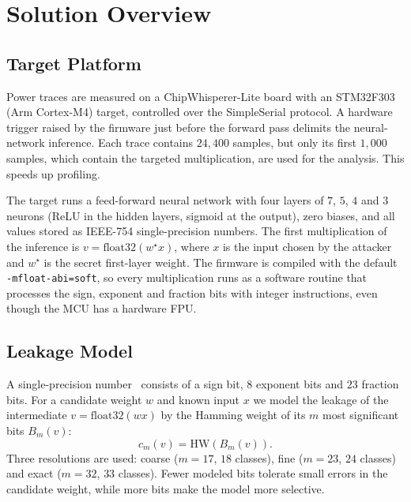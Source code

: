 \chapter{Solution Overview}
\label{chap:solution}

\section{Target Platform}
\label{sec:target-platform}

Power traces are measured on a ChipWhisperer-Lite board with an
STM32F303 (Arm Cortex-M4) target, controlled over the SimpleSerial
protocol. A hardware trigger raised by the firmware just before the
forward pass delimits the neural-network inference. Each trace contains
$24{,}400$ samples, but only its first $1{,}000$ samples, which contain
the targeted multiplication, are used for the analysis. This speeds up
profiling.

The target runs a feed-forward neural network with four layers of
$7$, $5$, $4$ and $3$ neurons (ReLU in the hidden layers, sigmoid at the
output), zero biases, and all values stored as IEEE-754 single-precision
numbers. The first multiplication of the inference is
$v=\mathrm{float32}(w^\star x)$, where $x$ is the input chosen by the
attacker and $w^\star$ is the secret first-layer weight. The firmware is
compiled with the default \texttt{-mfloat-abi=soft}, so every
multiplication runs as a software routine that processes the sign,
exponent and fraction bits with integer instructions, even though the
MCU has a hardware FPU.

\section{Leakage Model}
\label{sec:leakage-model}

A single-precision number~\cite{IEEE754} consists of a sign bit, $8$ exponent bits and
$23$ fraction bits. For a candidate weight $w$ and known input $x$ we
model the leakage of the intermediate $v=\mathrm{float32}(wx)$ by the
Hamming weight of its $m$ most significant bits $B_m(v)$:
\begin{equation}
	c_m(v)=\mathrm{HW}\left(B_m(v)\right).
\end{equation}
Three resolutions are used: coarse ($m=17$, $18$ classes), fine
($m=23$, $24$ classes) and exact ($m=32$, $33$ classes). Fewer modeled
bits tolerate small errors in the candidate weight, while more bits make
the model more selective.

